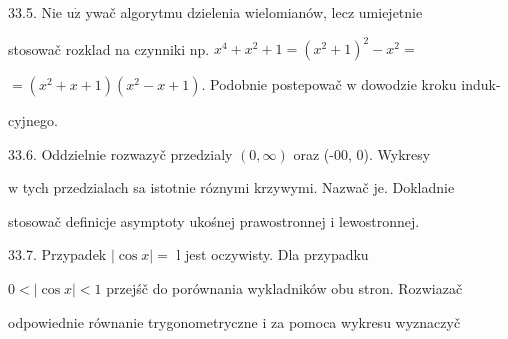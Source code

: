\documentclass[a4paper,12pt]{article}
\begin{document}
33.5. Nie $\mathrm{u}\dot{\mathrm{z}}$ ywač algorytmu dzielenia wielomianów, lecz umiejetnie

stosowač rozklad na czynniki np. $x^{4} +x^{2} + 1 = (x^{2}+1)^{2} - x^{2} =$

$=(x^{2}+x+1)(x^{2}-x+1)$. Podobnie postepowač $\mathrm{w}$ dowodzie kroku induk-

cyjnego.

33.6. Oddzielnie rozwazyč przedzialy $(0,\infty)$ oraz (-00, 0). Wykresy

$\mathrm{w}$ tych przedzialach sa istotnie róznymi krzywymi. Nazwač je. Dokladnie

stosowač definicje asymptoty ukośnej prawostronnej $\mathrm{i}$ lewostronnej.

33.7. Przypadek $|\cos x| =$ l jest oczywisty. Dla przypadku

$0< |\cos x| <1$ przejśč do porównania wykladników obu stron. Rozwiazač

odpowiednie równanie trygonometryczne $\mathrm{i}$ za pomoca wykresu wyznaczyč
\end{document}
